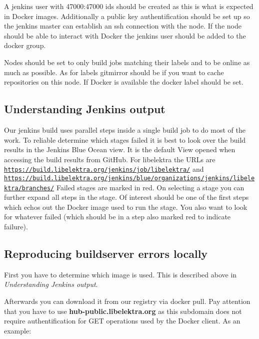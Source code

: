 A {\ttfamily jenkins} user with 47000\+:47000 ids should be created as this is what is expected in Docker images. Additionally a public key authentification should be set up so the jenkins master can establish an ssh connection with the node. If the node should be able to interact with Docker the jenkins user should be added to the {\ttfamily docker} group.

Nodes should be set to only build jobs matching their labels and to be online as much as possible. As for labels {\ttfamily gitmirror} should be if you want to cache repositories on this node. If Docker is available the {\ttfamily docker} label should be set.

\subsection*{Understanding Jenkins output}

Our jenkins build uses parallel steps inside a single build job to do most of the work. To reliable determine which stages failed it is best to look over the build results in the Jenkins Blue Ocean view. It is the default View opened when accessing the build results from Git\+Hub. For libelektra the U\+R\+Ls are \href{https://build.libelektra.org/jenkins/job/libelektra/}{\tt https\+://build.\+libelektra.\+org/jenkins/job/libelektra/} and \href{https://build.libelektra.org/jenkins/blue/organizations/jenkins/libelektra/branches/}{\tt https\+://build.\+libelektra.\+org/jenkins/blue/organizations/jenkins/libelektra/branches/} Failed stages are marked in red. On selecting a stage you can further expand all steps in the stage. Of interest should be one of the first steps which echos out the Docker image used to run the stage. You also want to look for whatever failed (which should be in a step also marked red to indicate failure).

\subsection*{Reproducing buildserver errors locally}

First you have to determine which image is used. This is described above in {\itshape Understanding Jenkins output}.

Afterwards you can download it from our registry via {\ttfamily docker pull}. Pay attention that you have to use {\bfseries hub-\/public.\+libelektra.\+org} as this subdomain does not require authentification for G\+ET operations used by the Docker client. As an example\+:



